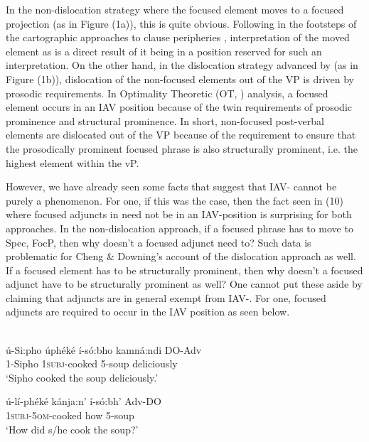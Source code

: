 \documentclass[output=paper
,newtxmath
,modfonts
,nonflat]{langsci/langscibook}
\begin{document}
In the non-dislocation strategy where the focused element moves to a focused projection (as in Figure (1a)), this is quite obvious. Following in the footsteps of the cartographic approaches to clause peripheries \citep{rizzi1997}, interpretation of the moved element as  is a direct result of it being in a position reserved for such an interpretation. On the other hand, in the dislocation strategy advanced by \citet{chengdowning2012} (as in Figure (1b)), dislocation of the non-focused elements out of the VP is driven by prosodic requirements. In  Optimality Theoretic (OT, \citealt{Prince1993}) analysis, a focused element occurs in an IAV position because of the twin requirements of prosodic prominence and structural prominence. In short, non-focused post-verbal elements are dislocated out of the VP because of the requirement to ensure that the prosodically prominent focused phrase is also structurally prominent, i.e. the highest element within the vP. 

However, we have already seen some  facts that suggest that IAV- cannot be purely a  phenomenon. For one, if this was the case, then the fact seen in (10) where focused adjuncts in  need not be in an IAV-position is surprising for both approaches. In the non-dislocation approach, if a focused phrase has to move to Spec, FocP, then why doesn't a focused adjunct need to? Such data is problematic for Cheng \& Downing's account of the dislocation approach as well. If a focused element has to be structurally prominent, then why doesn’t a focused adjunct have to be structurally prominent as well? One cannot put these aside by claiming that adjuncts are in general exempt from IAV-. For one,  focused adjuncts are required to occur in the IAV position as seen below.

\ea\label{ex:selvanathan:12}
 \citep[8]{chengdowning2014}\\
\ea\label{ex:selvanathan:12a}
	\gll ú-Si:pho  úphéké          í-só:bho   kamná:ndi  DO-Adv\\
	1-Sipho   \textsc{1subj}{}-cooked    5-soup    deliciously\\
\glt `Sipho cooked the soup deliciously.'

\ex\label{ex:selvanathan:12b}
	\gll ú-lí-phéké          kánja:n’    í-só:bh’     Adv-DO\\
\textsc{1subj}{}-\textsc{5om}{}-cooked   how     5-soup\\
\glt `How did s/he cook the soup?'
\end{document}
